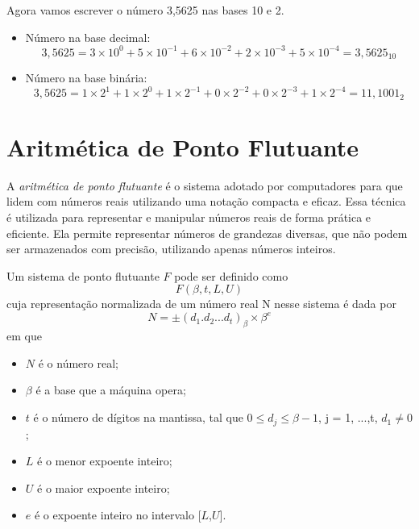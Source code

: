 \begin{ex}
Agora vamos escrever o número 3,5625 nas bases 10 e 2.

\begin{itemize}
    \item Número na base decimal: 
    \[
    3{,}5625 = 3 \times 10^0 + 5 \times 10^{-1} + 6 \times 10^{-2} + 2 \times 10^{-3} + 5 \times 10^{-4} = 3{,}5625_{10}
    \]
    
    \item Número na base binária:
    \[
    3{,}5625 = 1\times 2^{1} + 1 \times 2^0 + 1 \times 2^{-1} + 0 \times 2^{-2} + 0 \times 2^{-3} + 1 \times 2^{-4} = 11{,}1001_2
    \]
\end{itemize}
\end{ex}

\section{Aritmética de Ponto Flutuante}

A \textit{aritmética de ponto flutuante} é o sistema adotado por computadores para que lidem com números reais utilizando uma notação compacta e eficaz. Essa técnica é utilizada para representar e manipular números reais de forma prática e eficiente. Ela permite representar números de grandezas diversas, que não podem ser armazenados com precisão, utilizando apenas números inteiros.


Um sistema de ponto flutuante $F$ pode ser definido como
\[
F(\beta, t, L, U)\]
cuja representação normalizada de um número real N nesse sistema é dada por
\begin{equation}
N = \pm (d_{1}.d_{2} . . . d_{t})_\beta \times \beta^e 
\end{equation}
em que
\begin{itemize}
  \item \( N \) é o número real;
  \item \(\beta\) é a base que a máquina opera;
  \item \( t \) é o número de dígitos na mantissa, tal que \( 0 \leq d_{j} \leq \beta-1 \), j = 1, ...,t, \(d_{1} \neq 0\);
  \item \( L \) é o menor expoente inteiro;
  \item \( U \) é o maior expoente inteiro;
  \item \( e \) é o expoente inteiro no intervalo [\( L \),\( U \)].
\end{itemize}



